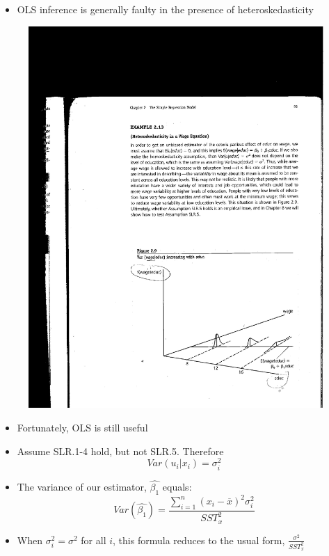 \documentclass[notes=show]{beamer}
\begin{document}
\begin{frame}[plain]

	\begin{itemize}

	\item OLS inference is generally faulty in the presence of heteroskedasticity
	\end{itemize}

\begin{figure}
\includegraphics[scale=0.7]{./lecture_includes/wooldridge_fig29.pdf}
\end{figure}
\end{frame}




\begin{frame}[plain]

	\begin{itemize}
	\item Fortunately, OLS is still useful
	\item Assume SLR.1-4 hold, but not SLR.5.  Therefore $$Var(u_i|x_i) = \sigma_i^2$$
	\item The variance of our estimator, $\widehat{\beta_1}$ equals:  $$Var (\widehat{\beta_1}) = \frac{\sum_{i=1}^n (x_i - \overline{x})^2 \sigma_i^2}{SST_x^2}$$
	\item When $\sigma_i^2=\sigma^2$ for all $i$, this formula reduces to the usual form, $\frac{\sigma^2}{SST_x^2}$
	\end{itemize}
	
\end{frame}
\end{document}

